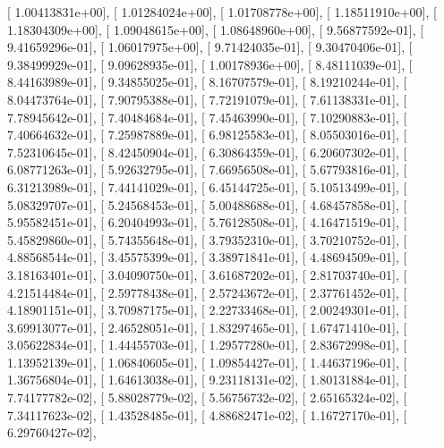 \documentclass{article}
\begin{document}
       [  1.00413831e+00],
       [  1.01284024e+00],
       [  1.01708778e+00],
       [  1.18511910e+00],
       [  1.18304309e+00],
       [  1.09048615e+00],
       [  1.08648960e+00],
       [  9.56877592e-01],
       [  9.41659296e-01],
       [  1.06017975e+00],
       [  9.71424035e-01],
       [  9.30470406e-01],
       [  9.38499929e-01],
       [  9.09628935e-01],
       [  1.00178936e+00],
       [  8.48111039e-01],
       [  8.44163989e-01],
       [  9.34855025e-01],
       [  8.16707579e-01],
       [  8.19210244e-01],
       [  8.04473764e-01],
       [  7.90795388e-01],
       [  7.72191079e-01],
       [  7.61138331e-01],
       [  7.78945642e-01],
       [  7.40484684e-01],
       [  7.45463990e-01],
       [  7.10290883e-01],
       [  7.40664632e-01],
       [  7.25987889e-01],
       [  6.98125583e-01],
       [  8.05503016e-01],
       [  7.52310645e-01],
       [  8.42450904e-01],
       [  6.30864359e-01],
       [  6.20607302e-01],
       [  6.08771263e-01],
       [  5.92632795e-01],
       [  7.66956508e-01],
       [  5.67793816e-01],
       [  6.31213989e-01],
       [  7.44141029e-01],
       [  6.45144725e-01],
       [  5.10513499e-01],
       [  5.08329707e-01],
       [  5.24568453e-01],
       [  5.00488688e-01],
       [  4.68457858e-01],
       [  5.95582451e-01],
       [  6.20404993e-01],
       [  5.76128508e-01],
       [  4.16471519e-01],
       [  5.45829860e-01],
       [  5.74355648e-01],
       [  3.79352310e-01],
       [  3.70210752e-01],
       [  4.88568544e-01],
       [  3.45575399e-01],
       [  3.38971841e-01],
       [  4.48694509e-01],
       [  3.18163401e-01],
       [  3.04090750e-01],
       [  3.61687202e-01],
       [  2.81703740e-01],
       [  4.21514484e-01],
       [  2.59778438e-01],
       [  2.57243672e-01],
       [  2.37761452e-01],
       [  4.18901151e-01],
       [  3.70987175e-01],
       [  2.22733468e-01],
       [  2.00249301e-01],
       [  3.69913077e-01],
       [  2.46528051e-01],
       [  1.83297465e-01],
       [  1.67471410e-01],
       [  3.05622834e-01],
       [  1.44455703e-01],
       [  1.29577280e-01],
       [  2.83672998e-01],
       [  1.13952139e-01],
       [  1.06840605e-01],
       [  1.09854427e-01],
       [  1.44637196e-01],
       [  1.36756804e-01],
       [  1.64613038e-01],
       [  9.23118131e-02],
       [  1.80131884e-01],
       [  7.74177782e-02],
       [  5.88028779e-02],
       [  5.56756732e-02],
       [  2.65165324e-02],
       [  7.34117623e-02],
       [  1.43528485e-01],
       [  4.88682471e-02],
       [  1.16727170e-01],
       [  6.29760427e-02],
\end{document}

